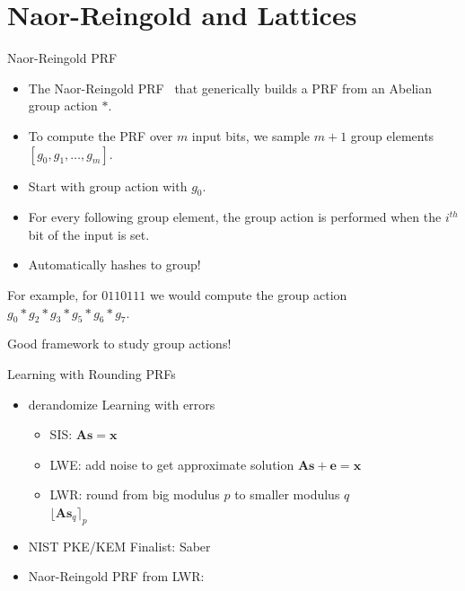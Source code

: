 \documentclass[10pt]{beamer}
\newcommand{\bv}[1]{\mathbf{#1}}
\begin{document}
\section{Naor-Reingold and Lattices}
\begin{frame}{Naor-Reingold PRF~\cite{NaoRei04}}
  \begin{itemize}
    \item The Naor-Reingold PRF~\cite{NaoRei04} that generically builds a PRF
      from an Abelian group action $*$.\pause
    \item
      To compute the PRF over $m$ input bits, we sample $m+1$ group elements $[g_0,
      g_1, \ldots, g_m]$. \pause
    \item Start with group action with $g_0$.\pause
    \item For every following
      group element, the group action is performed when the $i^{th}$ bit of the input is set. \pause
    \item Automatically hashes to group! \pause
  \end{itemize}
  \begin{example}
    For example, for $0110111$ we would
    compute the group action $g_0*g_2*g_3*g_5*g_6*g_7$.
  \end{example}\pause
  \alert{Good framework to study group actions!}
\end{frame}

\begin{frame}{Learning with Rounding PRFs}
  \begin{itemize}
    \item \alert{derandomize} Learning with errors \pause
      \begin{itemize}
        \item SIS: $\bv{As}=\bv{x}$
        \item LWE: add noise to get approximate solution $\bv{As}+\bv{e}=\bv{x}$
        \item LWR: round from big modulus $p$ to smaller modulus $q$\\ 
          $\lfloor\bv{As}_q\rceil_p$\pause
      \end{itemize}
    \item NIST PKE/KEM Finalist: Saber~\cite{NISTPQC-R3:SABER20}\pause
    \item Naor-Reingold PRF from LWR: 
  \end{itemize}
  \onslide<1->{
    \begin{align*}
      \mathcal{F}_{\bv{K}}(c_1,
      \cdots,c_m)=S\left(\bv{k}_0 \prod_{i=1}^m \bv{k}_{i}^{c_i}\right)
    \end{align*}
  }


\end{frame}
\end{document}
